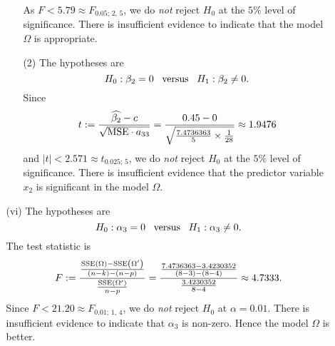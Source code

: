 \documentclass[11pt]{article}
\begin{document}
\begin{enumerate}
\begin{enumerate}
\begin{enumerate}
As $F < 5.79 \approx F_{0.05;\,2,\,5}$, we do {\em not\/} reject $H_0$ at the $5\%$ level of significance. There is insufficient evidence to indicate that the model $\Omega$ is appropriate.
\item[(2)]
The hypotheses are
$$
H_0 : \beta_2 = 0 \ \ \, {\rm versus} \ \ \, H_1 : \beta_2 \ne 0.
$$
Since
$$
t := \frac{\widehat{\beta_2} - c}{\sqrt{{\rm MSE} \cdot a_{33}}} = \frac{0.45 - 0}{\sqrt{\frac{7.4736363}{5} \times \frac{1}{28}}} \approx 1.9476
$$
and $|t| < 2.571 \approx t_{0.025;\,5}$, we do {\em not\/} reject $H_0$ at the $5\%$ level of significance. There is insufficient evidence that the predictor variable $x_2$ is significant in the model $\Omega$.
\end{enumerate}
\item[(vi)]
The hypotheses are
$$
H_0 : \alpha_3 = 0 \ \ \, {\rm versus} \ \ \, H_1 : \alpha_3 \ne 0.
$$
The test statistic is
$$
F := \frac{\frac{{\rm SSE}(\Omega) - {\rm SSE}\left(\Omega'\right)}{(n - k) - (n - p)}}{\frac{{\rm SSE}\left(\Omega'\right)}{n - p}} = \frac{\frac{7.4736363 - 3.4230352}{(8 - 3) - (8 - 4)}}{\frac{3.4230352}{8 - 4}} \approx 4.7333.
$$
Since $F < 21.20 \approx F_{0.01;\,1,\,4}$, we do {\em not\/} reject $H_0$ at $\alpha = 0.01$. There is insufficient evidence to indicate that $\alpha_3$ is non-zero. Hence the model $\Omega$ is better.
\end{enumerate}
\end{enumerate}

\vspace{0.5cm}

\end{document}
